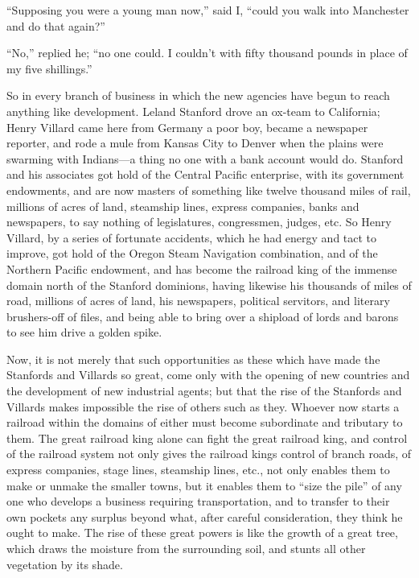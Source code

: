 \documentclass{book}
\begin{document}
“Supposing you were a young man now,” said I, “could you walk into Manchester and do that again?”

“No,” replied he; “no one could. I couldn’t with fifty thousand pounds in place of my five shillings.”

So in every branch of business in which the new agencies have begun to reach anything like development. Leland Stanford drove an ox-team to California; Henry Villard came here from Germany a poor boy, became a newspaper reporter, and rode a mule from Kansas City to Denver when the plains were swarming with Indians—a thing no one with a bank account would do. Stanford and his associates got hold of the Central Pacific enterprise, with its government endowments, and are now masters of something like twelve thousand miles of rail, millions of acres of land, steamship lines, express companies, banks and newspapers, to say nothing of legislatures, congressmen, judges, etc. So Henry Villard, by a series of fortunate accidents, which he had energy and tact to improve, got hold of the Oregon Steam Navigation combination, and of the Northern Pacific endowment, and has become the railroad king of the immense domain north of the Stanford dominions, having likewise his thousands of miles of road, millions of acres of land, his newspapers, political servitors, and literary brushers-off of files, and being able to bring over a shipload of lords and barons to see him drive a golden spike.

Now, it is not merely that such opportunities as these which have made the Stanfords and Villards so great, come only with the opening of new countries and the development of new industrial agents; but that the rise of the Stanfords and Villards makes impossible the rise of others such as they. Whoever now starts a railroad within the domains of either must become subordinate and tributary to them. The great railroad king alone can fight the great railroad king, and control of the railroad system not only gives the railroad kings control of branch roads, of express companies, stage lines, steamship lines, etc., not only enables them to make or unmake the smaller towns, but it enables them to “size the pile” of any one who develops a business requiring transportation, and to transfer to their own pockets any surplus beyond what, after careful consideration, they think he ought to make. The rise of these great powers is like the growth of a great tree, which draws the moisture from the surrounding soil, and stunts all other vegetation by its shade.
\end{document}
